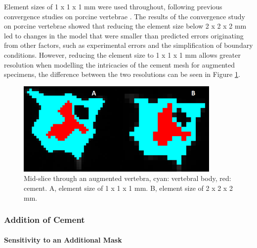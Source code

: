 Element sizes of 1 x 1 x 1 mm were used throughout, following previous
convergence studies on porcine vertebrae \cite{Jones2007}. The
results of the convergence study on porcine vertebrae showed that reducing the element
size below 2 x 2 x 2 mm led to changes in the model that were smaller
than predicted errors originating from other factors, such as
experimental errors and the simplification of boundary conditions.
However, reducing the element size to 1 x 1 x 1 mm allows greater
resolution when modelling the intricacies of the cement mesh for
augmented specimens, the difference between the two resolutions can be
seen in Figure \ref{fig:vertslice}.

\begin{figure}[ht!]

\centering
\includegraphics[width=3.90994in,height=1.80208in]{images/res_comp.png}
\caption{Mid-slice through an augmented vertebra, cyan: vertebral body, red:
cement. A, element size of 1 x 1 x 1 mm. B, element size of 2 x 2 x
2 mm.}
\label{fig:vertslice}
\end{figure}

\subsubsection{Addition of Cement}\label{addition-of-cement}

\paragraph{Sensitivity to an Additional
Mask}\label{sensitivity-to-an-additional-mask}

